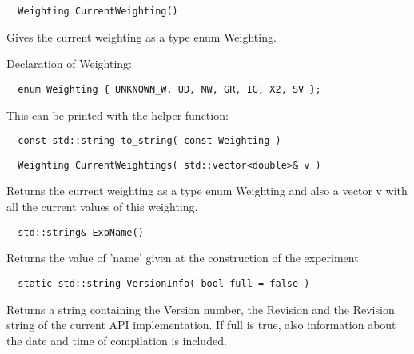 \documentclass{report}
\begin{document}
\begin{footnotesize}
\begin{verbatim}
  Weighting CurrentWeighting()
\end{verbatim}
\end{footnotesize}

Gives the current weighting as a type enum Weighting.

Declaration of Weighting:

\begin{footnotesize}
\begin{verbatim}
  enum Weighting { UNKNOWN_W, UD, NW, GR, IG, X2, SV };
\end{verbatim}
\end{footnotesize}

This can be printed with the helper function: 

\begin{footnotesize}
\begin{verbatim}
  const std::string to_string( const Weighting )
\end{verbatim}
\end{footnotesize}


\begin{footnotesize}
\begin{verbatim}
  Weighting CurrentWeightings( std::vector<double>& v )
\end{verbatim}
\end{footnotesize}

Returns the current weighting as a type enum Weighting and also a
vector v with all the current values of this weighting.

\begin{footnotesize}
\begin{verbatim}
  std::string& ExpName()
\end{verbatim}
\end{footnotesize}

Returns the value of 'name' given at the construction of the experiment

\begin{footnotesize}
\begin{verbatim}
  static std::string VersionInfo( bool full = false )
\end{verbatim}
\end{footnotesize}

Returns a string containing the Version number, the Revision and the
Revision string of the current API implementation. If full is true,
also information about the date and time of compilation is included.
\end{document}
